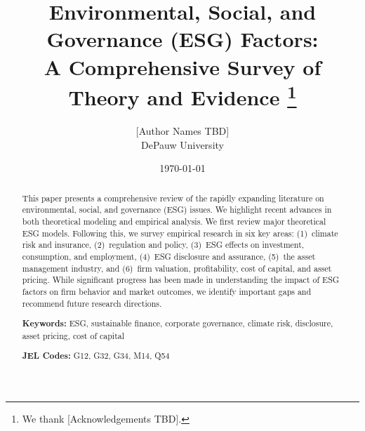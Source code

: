 \documentclass[12pt,letterpaper]{article}
\title{\textbf{Environmental, Social, and Governance (ESG) Factors:\\
A Comprehensive Survey of Theory and Evidence}%
\thanks{We thank [Acknowledgements TBD].}}
\author{[Author Names TBD]\\
\small DePauw University}
\date{\today}
\begin{document}
\maketitle
\thispagestyle{empty}

\begin{abstract}
\noindent
This paper presents a comprehensive review of the rapidly expanding literature
on environmental, social, and governance (ESG) issues. We highlight recent
advances in both theoretical modeling and empirical analysis. We first review
major theoretical ESG models. Following this, we survey empirical research in
six key areas: (1)~climate risk and insurance, (2)~regulation and policy,
(3)~ESG effects on investment, consumption, and employment,
(4)~ESG disclosure and assurance, (5)~the asset management industry, and
(6)~firm valuation, profitability, cost of capital, and asset pricing.
While significant progress has been made in understanding the impact of ESG
factors on firm behavior and market outcomes, we identify important gaps and
recommend future research directions.

\medskip\noindent
\textbf{Keywords:} ESG, sustainable finance, corporate governance, climate risk,
disclosure, asset pricing, cost of capital

\medskip\noindent
\textbf{JEL Codes:} G12, G32, G34, M14, Q54
\end{abstract}

\newpage
\tableofcontents
\newpage























\newpage

\end{document}
